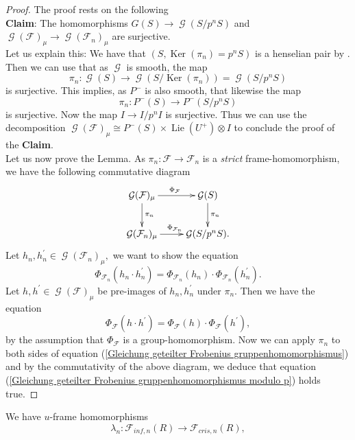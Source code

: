 \documentclass[a4paper,10,5 pt]{amsart}
\theoremstyle{definition}
\DeclareMathOperator{\Lie}{Lie}
\DeclareMathOperator{\Ker}{Ker}
\DeclareMathOperator{\G}{\mathcal{G}}
\begin{document}
\begin{proof}
The proof rests on the following 
\\
\textbf{Claim}: The homomorphisms $G(S)\rightarrow \G(S/p^{n}S)$ and $\G(\mathcal{F})_{\mu}\rightarrow \G(\mathcal{F}_{n})_{\mu}$ are surjective.
\\
Let us explain this: We have that $(S,\Ker(\pi_{n})=p^{n}S)$ is a henselian pair by \cite[Tag 0CT7]{stacks-project}. Then we can use that as $\G$ is smooth, the map
$$\pi_{n}\colon \G(S)\rightarrow \G(S/\Ker(\pi_{n}))=\G(S/p^{n}S)$$ is surjective. This implies, as $P^{-}$ is also smooth, that likewise the map
$$\pi_{n}\colon P^{-}(S) \rightarrow P^{-}(S/p^{n}S)$$ is surjective. Now the map $I\rightarrow I/p^{n}I$ is surjective. Thus we can use the decomposition $\G(\mathcal{F})_{\mu}\cong P^{-}(S) \times \Lie(U^{+})\otimes I$ to conclude the proof of the \textbf{Claim}.
\\
Let us now prove the Lemma. As $\pi_{n}\colon \mathcal{F}\rightarrow \mathcal{F}_{n}$ is a \textit{strict} frame-homomorphism, we have the following commutative diagram
$$
\xymatrix{
\G(\mathcal{F})_{\mu} \ar[r]^{\Phi_{\mathcal{F}}} \ar[d]^{\pi_{n}} & \G(S) \ar[d]^{\pi_{n}} \\
 \G(\mathcal{F}_{n})_{\mu} \ar[r]^{\Phi_{\mathcal{F}_{n}}} & \G(S/p^{n}S).
}
$$
Let $h_{n},h_{n}^{\prime}\in \G(\mathcal{F}_{n})_{\mu} ,$ we want to show the equation
\begin{equation}\label{Gleichung geteilter Frobenius gruppenhomomorphismus modulo p}
\Phi_{\mathcal{F}_{n}}(h_{n}\cdot h_{n}^{\prime})=\Phi_{\mathcal{F}_{n}}(h_{n})\cdot \Phi_{\mathcal{F}_{n}}(h_{n}^{\prime}).
\end{equation}
Let $h,h^{\prime}\in \G(\mathcal{F})_{\mu}$ be pre-images of $h_{n},h_{n}^{\prime}$ under $\pi_{n}.$ Then we have the equation
\begin{equation}\label{Gleichung geteilter Frobenius gruppenhomomorphismus}
\Phi_{\mathcal{F}}(h\cdot h^{\prime})=\Phi_{\mathcal{F}}(h)\cdot \Phi_{\mathcal{F}}(h^{\prime}),
\end{equation}
by the assumption that $\Phi_{\mathcal{F}}$ is a group-homomorphism. Now we can apply $\pi_{n}$ to both sides of equation (\ref{Gleichung geteilter Frobenius gruppenhomomorphismus}) and by the commutativity of the above diagram, we deduce that equation (\ref{Gleichung geteilter Frobenius gruppenhomomorphismus modulo p}) holds true.
\end{proof}
We have $u$-frame homomorphisms
$$
\lambda_{n}\colon \mathcal{F}_{inf,n}(R)\rightarrow \mathcal{F}_{cris,n}(R),
$$
\end{document}
